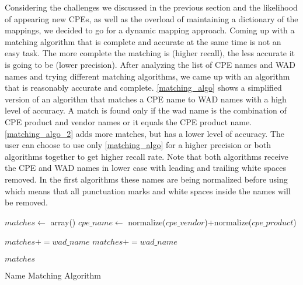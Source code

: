 Considering the challenges we discussed in the previous section and the likelihood of appearing new CPEs, as well as the overload of maintaining a dictionary of the mappings, we decided to go for a dynamic mapping approach. 
Coming up with a matching algorithm that is complete and accurate at the same time is not an easy task. The more complete the matching is (higher recall), the less accurate it is going to be (lower precision). After analyzing the list of CPE names and WAD names and trying different matching algorithms, we came up with an algorithm that is reasonably accurate and complete. \ref{matching_algo} shows a simplified version of an algorithm that matches a CPE name to WAD names with a high level of accuracy. A match is found only if the wad name is the combination of CPE product and vendor names or it equals the CPE product name. \ref{matching_algo_2} adds more matches, but has a lower level of accuracy. The user can choose to use only \ref{matching_algo} for a higher precision or both algorithms together to get higher recall rate. Note that both algorithms receive the CPE and WAD names in lower case with leading and trailing white spaces removed. In the first algorithms these names are being normalized before using which means that all punctuation marks and white spaces inside the names will be removed.  
\begin{algorithm}
\begin{algorithmic}
\STATE $matches\gets$ array()
\STATE $cpe\_name\gets$ normalize($cpe\_vendor$)+normalize($cpe\_product$)


		\STATE $matches+=wad\_name$
		\STATE $matches+=wad\_name$
		
		\ENDIF
\ENDFOR
\RETURN $matches$
%
%
%

\end{algorithmic}
\caption{Name Matching Algorithm}
\label{matching_algo}
\end{algorithm}

